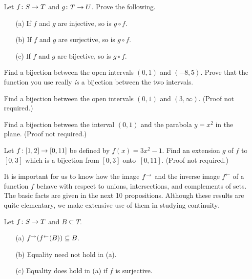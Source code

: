\begin{prob}  Let $f\colon S \rightarrow T$ and $g\colon T \rightarrow U$.  Prove the following.
 \begin{enumerate}
  \item[(a)] If $f$ and $g$ are injective, so is $g \circ f$.
  \item[(b)] If $f$ and $g$ are surjective, so is $g \circ f$.
  \item[(c)] If $f$ and $g$ are bijective, so is $g \circ f$.
 \end{enumerate}
\end{prob}

\begin{prob}  Find a bijection between the open intervals $(0,1)$ and $(-8,5)$. Prove that the
function you use really \emph{is} a bijection between the two intervals.
\end{prob}

\begin{prob}  Find a bijection between the open intervals $(0,1)$ and $(3,\infty)$. (Proof not
required.)
\end{prob}

\begin{prob}   Find a bijection between the interval $(0,1)$ and the parabola $y = x^2$ in the
plane. (Proof not required.)
\end{prob}

\begin{prob}  Let $f\colon [1,2] \rightarrow [0,11]$ be defined by $f(x) = 3x^2 - 1$. Find an extension
$g$ of $f$ to $[0,3]$ which is a bijection from $[0,3]$ onto~$[0,11]$. (Proof not required.)
\end{prob}

It is important for us to know how the image $f^{\rightarrow}$ and the inverse image $f^\gets$ of a
function $f$ behave with respect to unions, intersections, and complements of sets. The basic
facts are given in the next 10 propositions. Although these results are quite elementary, we
make extensive use of them in studying continuity.

\begin{prop}\label{prop_f_finv} Let $f\colon S \rightarrow T$ and $B \subseteq T$.
 \begin{enumerate}
   \item[(a)] $f^{\rightarrow}(f^{\gets}(B)) \subseteq B$.
   \item[(b)] Equality need not hold in (a).
   \item[(c)] Equality does hold in (a) if $f$ is surjective.
 \end{enumerate}
\end{prop}

